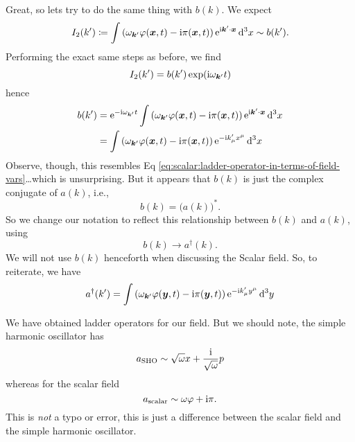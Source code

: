 Great, so lets try to do the same thing with $b(k)$. We expect 
\begin{equation}
I_{2}(k')\eqDef\int\left(\omega_{\vec{k}'}\varphi(\vec{x},t)-\I\pi(\vec{x},t)\right)\E^{\I\vec{k}'\cdot\vec{x}}\,\D^{3}x\looksLike b(k').
\end{equation}
Performing the exact same steps as before, we find
\begin{equation}
I_{2}(k') = b(k')\exp(\I\omega_{\vec{k}'}t)
\end{equation}
hence
\begin{equation}
\begin{split}
b(k') &= \E^{-\I\omega_{\vec{k}'}t}\int\left(\omega_{\vec{k}'}\varphi(\vec{x},t)-\I\pi(\vec{x},t)\right)\E^{\I\vec{k}'\cdot\vec{x}}\,\D^{3}x\\
&=
\int\left(\omega_{\vec{k}'}\varphi(\vec{x},t)-\I\pi(\vec{x},t)\right)\E^{-\I k'_{\mu}x^{\mu}}\,\D^{3}x
\end{split}
\end{equation}
Observe, though, this resembles Eq
\eqref{eq:scalar:ladder-operator-in-terms-of-field-vars}\dots which is
unsurprising. But it appears that $b(k)$ is just the complex conjugate
of $a(k)$, i.e.,
\begin{equation}
b(k) = \bigl(a(k)\bigr)^{*}.
\end{equation}
So we
change our notation to reflect this relationship between $b(k)$ and
$a(k)$, using
\begin{equation}
b(k)\to a^{\dagger}(k).
\end{equation}
We will not use $b(k)$ henceforth when discussing the Scalar field. So,
to reiterate, we have
\begin{equation}\label{eq:scalar:adjoint-ladder-operator-in-terms-of-field-vars}
a^{\dagger}(k') = \int\left(\omega_{\vec{k}'}\varphi(\vec{y},t)-\I\pi(\vec{y},t)\right)\E^{-\I k'_{\mu}y^{\mu}}\,\D^{3}y
\end{equation}

We have obtained ladder operators for our field. But we
should note, the simple harmonic oscillator has
\begin{equation}
a_{\text{SHO}}\sim \sqrt{\omega}x + \frac{{\rm i}}{\sqrt{\omega}}p
\end{equation}
whereas for the scalar field
\begin{equation}
a_{\text{scalar}}\sim \omega\varphi + {\rm i}\pi.
\end{equation}
This is \emph{not} a typo or error, this is just a difference
between the scalar field and the simple harmonic oscillator.

